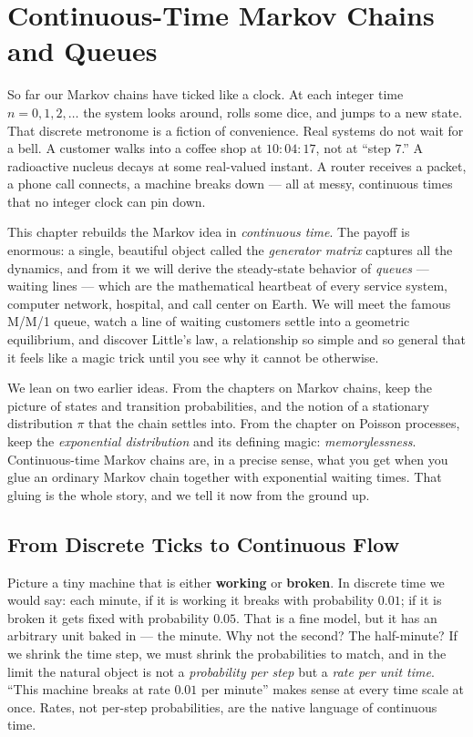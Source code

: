 \chapter{Continuous-Time Markov Chains and Queues}

So far our Markov chains have ticked like a clock. At each integer time $n = 0, 1, 2, \dots$ the
system looks around, rolls some dice, and jumps to a new state. That discrete metronome is a fiction
of convenience. Real systems do not wait for a bell. A customer walks into a coffee shop at
$10\!:\!04\!:\!17$, not at ``step $7$.'' A radioactive nucleus decays at some real-valued instant. A
router receives a packet, a phone call connects, a machine breaks down --- all at messy, continuous
times that no integer clock can pin down.

This chapter rebuilds the Markov idea in \emph{continuous time}. The payoff is enormous: a single,
beautiful object called the \emph{generator matrix} captures all the dynamics, and from it we will
derive the steady-state behavior of \emph{queues} --- waiting lines --- which are the mathematical
heartbeat of every service system, computer network, hospital, and call center on Earth. We will
meet the famous M/M/1 queue, watch a line of waiting customers settle into a geometric equilibrium,
and discover Little's law, a relationship so simple and so general that it feels like a magic trick
until you see why it cannot be otherwise.

We lean on two earlier ideas. From the chapters on Markov chains, keep the picture of states and
transition probabilities, and the notion of a stationary distribution $\pi$ that the chain settles
into. From the chapter on Poisson processes, keep the \emph{exponential distribution} and its
defining magic: \emph{memorylessness}. Continuous-time Markov chains are, in a precise sense, what
you get when you glue an ordinary Markov chain together with exponential waiting times. That gluing
is the whole story, and we tell it now from the ground up.

\chapterline

\section{From Discrete Ticks to Continuous Flow}
\label{ch27:intro}

\begin{intuitionbox}
Picture a tiny machine that is either \textbf{working} or \textbf{broken}. In discrete time we would
say: each minute, if it is working it breaks with probability $0.01$; if it is broken it gets fixed
with probability $0.05$. That is a fine model, but it has an arbitrary unit baked in --- the minute.
Why not the second? The half-minute? If we shrink the time step, we must shrink the probabilities to
match, and in the limit the natural object is not a \emph{probability per step} but a \emph{rate per
unit time}. ``This machine breaks at rate $0.01$ per minute'' makes sense at every time scale at
once. Rates, not per-step probabilities, are the native language of continuous time.
\end{intuitionbox}

